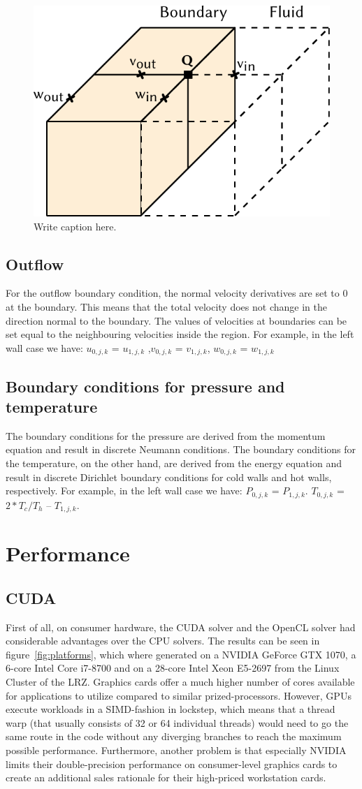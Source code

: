 \documentclass{article}%
\begin{document}
\begin{figure}[htb]
\centering
\includegraphics[width=0.4\linewidth]{images/BoundaryConditions.pdf}
\caption{Write caption here.}
\label{fig:boundaryConditions}
\end{figure}

\subsection{Outflow}
For the outflow boundary condition, the normal velocity derivatives are set to 0 at the boundary. This means that the total velocity does not change in the direction normal to the boundary. The values of velocities at boundaries can be set equal to the neighbouring velocities inside the region. For example, in the left wall case we have: $u_{0,j,k}$ = $u_{1,j,k}$ ,$v_{0,j,k}$ = $v_{1,j,k}$, $w_{0,j,k}$ = $w_{1,j,k}$
\subsection{Boundary conditions for pressure and temperature}
The boundary conditions for the pressure are derived from the momentum equation and result in discrete Neumann conditions. The boundary conditions for the temperature, on the other hand, are derived from the energy equation and result in discrete Dirichlet boundary conditions for cold walls and hot walls, respectively. For example, in the left wall case we have: $P_{0,j,k}$ = $P_{1,j,k}$.  $T_{0,j,k}$ = $2*T_c/T_h$ – $T_{1,j,k}$.

\section{Performance}
\subsection{CUDA}
First of all, on consumer hardware, the CUDA solver and the OpenCL solver had considerable advantages over the CPU solvers. The results can be seen in figure~\ref{fig:platforms}, which where generated on a NVIDIA GeForce GTX 1070, a 6-core Intel Core i7-8700 and on a 28-core Intel Xeon E5-2697 from the Linux Cluster of the LRZ. Graphics cards offer a much higher number of cores available for applications to utilize compared to similar prized-processors. However, GPUs execute workloads in a SIMD-fashion in lockstep, which means that a thread warp (that usually consists of 32 or 64 individual threads) would need to go the same route in the code without any diverging branches to reach the maximum possible performance. Furthermore, another problem is that especially NVIDIA limits their double-precision performance on consumer-level graphics cards to create an additional sales rationale for their high-priced workstation cards.
\end{document}

